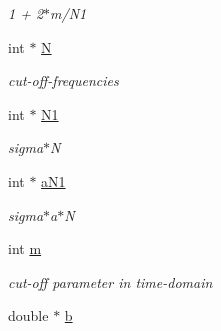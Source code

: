 \begin{CompactItemize}
\begin{CompactList}\small\item\em 1 + 2$\ast$m/N1 \item\end{CompactList}\item 
\hypertarget{structnnfft__plan_43e0e3140a0afdd551a95228be7e4ed7}{
int $\ast$ \hyperlink{structnnfft__plan_43e0e3140a0afdd551a95228be7e4ed7}{N}}
\label{structnnfft__plan_43e0e3140a0afdd551a95228be7e4ed7}

\begin{CompactList}\small\item\em cut-off-frequencies \item\end{CompactList}\item 
\hypertarget{structnnfft__plan_7467148139ddeaf34261c0c256f64643}{
int $\ast$ \hyperlink{structnnfft__plan_7467148139ddeaf34261c0c256f64643}{N1}}
\label{structnnfft__plan_7467148139ddeaf34261c0c256f64643}

\begin{CompactList}\small\item\em sigma$\ast$N \item\end{CompactList}\item 
\hypertarget{structnnfft__plan_dd59b0dfe6fced5130efcafa613abfcb}{
int $\ast$ \hyperlink{structnnfft__plan_dd59b0dfe6fced5130efcafa613abfcb}{aN1}}
\label{structnnfft__plan_dd59b0dfe6fced5130efcafa613abfcb}

\begin{CompactList}\small\item\em sigma$\ast$a$\ast$N \item\end{CompactList}\item 
\hypertarget{structnnfft__plan_1c5322ebb6d93515fc8a9e922c8a66da}{
int \hyperlink{structnnfft__plan_1c5322ebb6d93515fc8a9e922c8a66da}{m}}
\label{structnnfft__plan_1c5322ebb6d93515fc8a9e922c8a66da}

\begin{CompactList}\small\item\em cut-off parameter in time-domain \item\end{CompactList}\item 
\hypertarget{structnnfft__plan_a91e909254c1beb83e2e971df50b96ca}{
double $\ast$ \hyperlink{structnnfft__plan_a91e909254c1beb83e2e971df50b96ca}{b}}
\label{structnnfft__plan_a91e909254c1beb83e2e971df50b96ca}


\end{CompactItemize}
